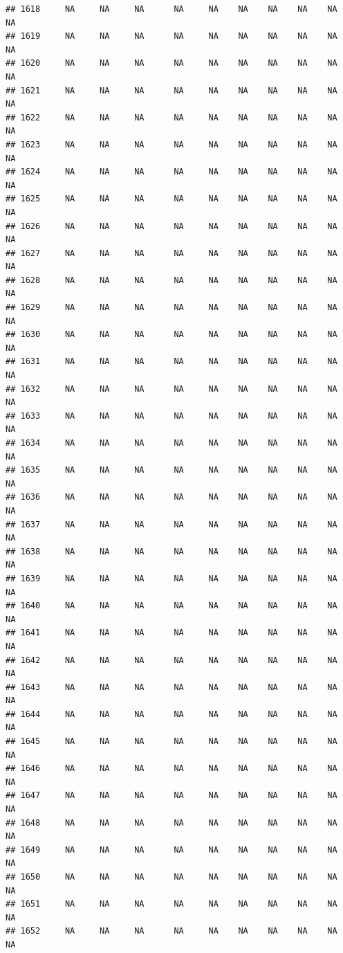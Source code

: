 \documentclass{article}\usepackage{graphicx, color}
\makeatletter
\newenvironment{kframe}{%
 \def\at@end@of@kframe{}%
 \ifinner\ifhmode%
  \def\at@end@of@kframe{\end{minipage}}%
  \begin{minipage}{\columnwidth}%
 \fi\fi%
 \def\FrameCommand##1{\hskip\@totalleftmargin \hskip-\fboxsep
 \colorbox{shadecolor}{##1}\hskip-\fboxsep
     \hskip-\linewidth \hskip-\@totalleftmargin \hskip\columnwidth}%
 \MakeFramed {\advance\hsize-\width
   \@totalleftmargin\z@ \linewidth\hsize
   \@setminipage}}%
 {\par\unskip\endMakeFramed%
 \at@end@of@kframe}
\newenvironment{knitrout}{}{} %
\makeatother
\begin{document}
\begin{knitrout}
\begin{kframe}
\begin{verbatim}
## 1618     NA     NA     NA      NA     NA    NA    NA    NA    NA     NA
## 1619     NA     NA     NA      NA     NA    NA    NA    NA    NA     NA
## 1620     NA     NA     NA      NA     NA    NA    NA    NA    NA     NA
## 1621     NA     NA     NA      NA     NA    NA    NA    NA    NA     NA
## 1622     NA     NA     NA      NA     NA    NA    NA    NA    NA     NA
## 1623     NA     NA     NA      NA     NA    NA    NA    NA    NA     NA
## 1624     NA     NA     NA      NA     NA    NA    NA    NA    NA     NA
## 1625     NA     NA     NA      NA     NA    NA    NA    NA    NA     NA
## 1626     NA     NA     NA      NA     NA    NA    NA    NA    NA     NA
## 1627     NA     NA     NA      NA     NA    NA    NA    NA    NA     NA
## 1628     NA     NA     NA      NA     NA    NA    NA    NA    NA     NA
## 1629     NA     NA     NA      NA     NA    NA    NA    NA    NA     NA
## 1630     NA     NA     NA      NA     NA    NA    NA    NA    NA     NA
## 1631     NA     NA     NA      NA     NA    NA    NA    NA    NA     NA
## 1632     NA     NA     NA      NA     NA    NA    NA    NA    NA     NA
## 1633     NA     NA     NA      NA     NA    NA    NA    NA    NA     NA
## 1634     NA     NA     NA      NA     NA    NA    NA    NA    NA     NA
## 1635     NA     NA     NA      NA     NA    NA    NA    NA    NA     NA
## 1636     NA     NA     NA      NA     NA    NA    NA    NA    NA     NA
## 1637     NA     NA     NA      NA     NA    NA    NA    NA    NA     NA
## 1638     NA     NA     NA      NA     NA    NA    NA    NA    NA     NA
## 1639     NA     NA     NA      NA     NA    NA    NA    NA    NA     NA
## 1640     NA     NA     NA      NA     NA    NA    NA    NA    NA     NA
## 1641     NA     NA     NA      NA     NA    NA    NA    NA    NA     NA
## 1642     NA     NA     NA      NA     NA    NA    NA    NA    NA     NA
## 1643     NA     NA     NA      NA     NA    NA    NA    NA    NA     NA
## 1644     NA     NA     NA      NA     NA    NA    NA    NA    NA     NA
## 1645     NA     NA     NA      NA     NA    NA    NA    NA    NA     NA
## 1646     NA     NA     NA      NA     NA    NA    NA    NA    NA     NA
## 1647     NA     NA     NA      NA     NA    NA    NA    NA    NA     NA
## 1648     NA     NA     NA      NA     NA    NA    NA    NA    NA     NA
## 1649     NA     NA     NA      NA     NA    NA    NA    NA    NA     NA
## 1650     NA     NA     NA      NA     NA    NA    NA    NA    NA     NA
## 1651     NA     NA     NA      NA     NA    NA    NA    NA    NA     NA
## 1652     NA     NA     NA      NA     NA    NA    NA    NA    NA     NA

\end{verbatim}
\end{kframe}
\end{knitrout}
\end{document}
